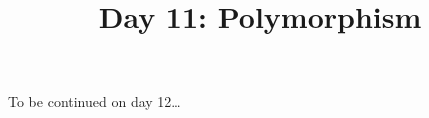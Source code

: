 \documentclass{article}
\begin{document}
\title{Day 11: Polymorphism}
\author{}
\date{}
\maketitle



\vspace{2cm}

To be continued on day 12\ldots
\end{document}
